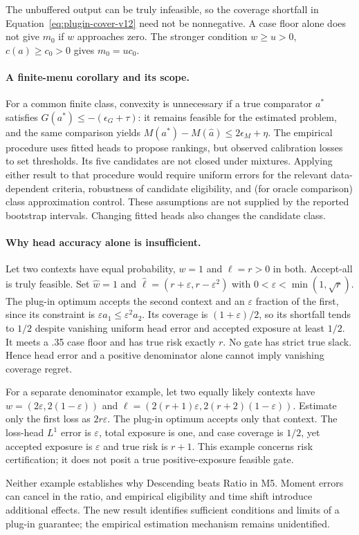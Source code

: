 The unbuffered output can be truly infeasible, so the coverage shortfall in
Equation~\eqref{eq:plugin-cover-v12} need not be nonnegative. A case floor
alone does not give $m_0$ if $w$ approaches zero. The stronger condition
$w\geq u>0$, $c(a)\geq c_0>0$ gives $m_0=uc_0$.

\paragraph{A finite-menu corollary and its scope.}
For a common finite class, convexity is unnecessary if a true comparator
$a^*$ satisfies $G(a^*)\leq-(\epsilon_G+\tau)$: it remains feasible for
the estimated problem, and the same comparison yields
$M(a^*)-M(\widehat a)\leq2\epsilon_M+\eta$.
The empirical procedure uses fitted heads to propose rankings, but observed
calibration losses to set thresholds. Its five candidates are not closed
under mixtures. Applying either result to that procedure would require
uniform errors for the relevant data-dependent criteria, robustness of
candidate eligibility, and (for oracle comparison) class approximation
control. These assumptions are not supplied by the reported bootstrap
intervals. Changing fitted heads also changes the candidate class.

\paragraph{Why head accuracy alone is insufficient.}
Let two contexts have equal probability, $w=1$ and $\ell=r>0$ in both.
Accept-all is truly feasible. Set $\widehat w=1$ and
$\widehat\ell=(r+\varepsilon,r-\varepsilon^2)$ with
$0<\varepsilon<\min(1,\sqrt r)$. The plug-in optimum accepts the second
context and an $\varepsilon$ fraction of the first, since its constraint
is $\varepsilon a_1\leq\varepsilon^2a_2$.
Its coverage is $(1+\varepsilon)/2$, so its shortfall tends to $1/2$
despite vanishing uniform head error and accepted exposure at least $1/2$.
It meets a .35 case floor and has true risk exactly $r$. No gate has strict
true slack. Hence head error and a positive denominator alone cannot imply
vanishing coverage regret.

For a separate denominator example, let two equally likely contexts have
$w=(2\varepsilon,2(1-\varepsilon))$ and
$\ell=(2(r+1)\varepsilon,2(r+2)(1-\varepsilon))$.
Estimate only the first loss as $2r\varepsilon$. The plug-in optimum
accepts only that context. The loss-head $L^1$ error is $\varepsilon$,
total exposure is one, and case coverage is $1/2$, yet accepted exposure
is $\varepsilon$ and true risk is $r+1$. This example concerns risk
certification; it does not posit a true positive-exposure feasible gate.

Neither example establishes why Descending beats Ratio in M5. Moment errors
can cancel in the ratio, and empirical eligibility and time shift introduce
additional effects. The new result identifies sufficient conditions and
limits of a plug-in guarantee; the empirical estimation mechanism remains
unidentified.
